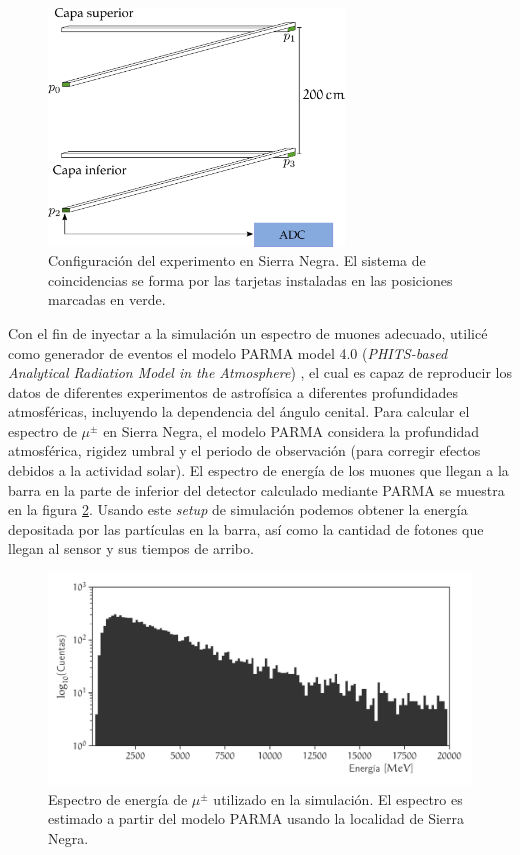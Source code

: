 \begin{figure}
        \centering
        \includegraphics[width=0.7\textwidth]{muons-experiment-0.pdf}
        \caption{Configuración del experimento en Sierra Negra. El sistema de coincidencias se forma por las tarjetas instaladas en las posiciones marcadas en verde.}
        \label{fig:muons-experiment-0}
\end{figure}

Con el fin de inyectar a la simulación un espectro de muones adecuado, utilicé como generador de eventos el modelo PARMA model 4.0 (\emph{PHITS-based Analytical Radiation Model in the Atmosphere}) \cite{sato15,sato16}, el cual es capaz de reproducir los datos de diferentes experimentos de astrofísica a diferentes profundidades atmosféricas, incluyendo la dependencia del ángulo cenital. Para calcular el espectro de $\mu^{\pm}$ en Sierra Negra, el modelo PARMA considera la profundidad atmosférica, rigidez umbral y el periodo de observación (para corregir efectos debidos a la actividad solar). El espectro de energía de los muones que llegan a la barra en la parte de inferior del detector calculado mediante PARMA se muestra en la figura \ref{fig:muons-spectrum}. Usando este \emph{setup} de simulación podemos obtener la energía depositada por las partículas en la barra, así como la cantidad de fotones que llegan al sensor y sus tiempos de arribo.

\begin{figure}
        \centering
        \includegraphics[width=\textwidth]{scibar-edep.pdf}
        \caption{Espectro de energía de $\mu^{\pm}$ utilizado en la simulación. El espectro es estimado a partir del modelo PARMA usando la localidad de Sierra Negra.}
        \label{fig:muons-spectrum}
\end{figure}


